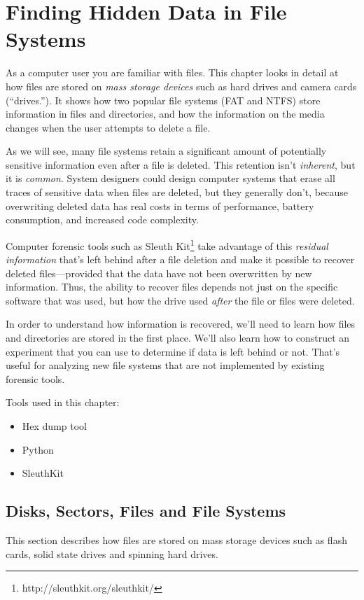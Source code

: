 \chapter{Finding Hidden Data in File Systems}
As a computer user you are familiar with files. This chapter looks in
detail at how files are stored on \emph{mass storage devices} such as
hard drives and camera cards (``drives.''). It shows how two popular file systems
(FAT and NTFS) store information in files and directories, and how the
information on the media changes when the user attempts to delete a
file.

As we will see, many file systems retain a significant amount of
potentially sensitive information even after a file is deleted. This
retention isn't \emph{inherent}, but it is \emph{common}. 
System designers could design computer systems that erase all traces of
sensitive data when files are deleted, but they generally don't, because
overwriting deleted data has real costs in terms of performance,
battery consumption, and increased code complexity.

Computer forensic tools such as Sleuth
Kit\footnote{http://sleuthkit.org/sleuthkit/} take advantage of this
\emph{residual information} that's left behind after a file deletion
and make it possible to recover deleted files---provided that the data
have not been overwritten by new information. Thus, the ability to
recover files depends not just on the specific software that
was used, but how the drive used \emph{after} the file or files were
deleted.   

In order to understand how information is recovered,
we'll need to learn how files and directories are stored in the first
place. We'll also learn how to construct an experiment that you can
use to determine if data is left behind or not. That's useful for
analyzing new file systems that are not implemented by existing
forensic tools.

Tools used in this chapter:
\begin{itemize}
\item Hex dump tool
\item Python
\item SleuthKit 
\end{itemize}

\section{Disks, Sectors, Files and File Systems}
This section describes how files are stored on mass storage devices
such as flash cards, solid state drives and spinning hard drives. 


